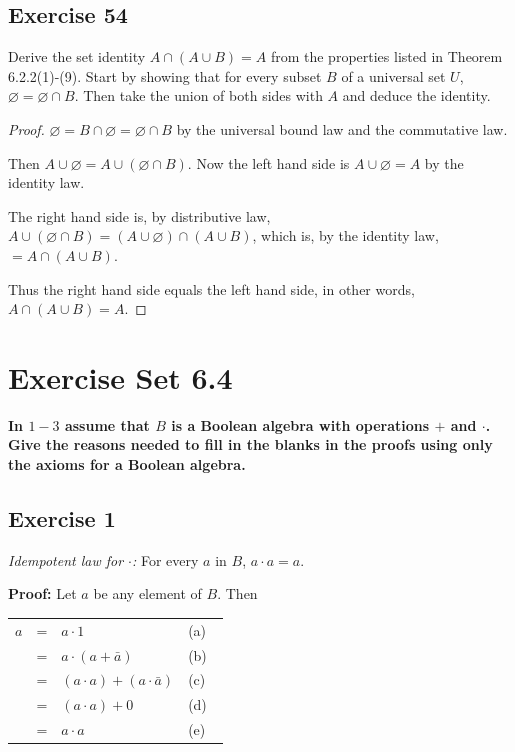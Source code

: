 \documentclass[14pt]{extarticle}
\newcommand{\es}{\varnothing}
\newcommand{\fbl}{\underline{\hspace{1cm}}\,\,}
\newcommand{\cy}{\color{cyan}}
\begin{document}
\subsection{Exercise 54}
Derive the set identity \(A \cap (A \cup B) = A\) from the properties listed in Theorem 6.2.2(1)-(9). Start by showing 
that for every subset $B$ of a universal set $U$, \(\es = \es \cap B\). Then take the union of both sides with $A$ 
and deduce the identity.

\begin{proof}
\(\es = B \cap \es = \es \cap B\) by the universal bound law and the commutative law.

Then \(A \cup \es = A \cup (\es \cap B)\). Now the left hand side is \(A \cup \es = A\) by the identity law.

The right hand side is, by distributive law, \(A \cup (\es \cap B) = (A \cup \es) \cap (A \cup B)\), which is, by the
identity law, \(= A \cap (A \cup B)\).

Thus the right hand side equals the left hand side, in other words, \(A \cap (A \cup B) = A\).
\end{proof}

\section{Exercise Set 6.4}

{\bf \cy In $1-3$ assume that $B$ is a Boolean algebra with operations $+$ and $\cdot$. Give the reasons needed to fill 
in the blanks in the proofs using only the axioms for a Boolean algebra.}

\subsection{Exercise 1}
{\it Idempotent law for $\cdot$:} For every $a$ in $B$, \(a \cdot a = a\).

{\bf Proof:} Let $a$ be any element of $B$. Then

\begin{center}
\begin{tabular}{rcll}
\(a\) & = & \(a \cdot 1\) & {\cy (a) \fbl} \\
\(\) & = & \(a \cdot (a + \bar{a})\) & {\cy (b) \fbl} \\
\(\) & = & \((a \cdot a) + (a \cdot \bar{a})\) & {\cy (c) \fbl} \\
\(\) & = & \((a \cdot a) + 0\) & {\cy (d) \fbl} \\
\(\) & = & \(a \cdot a\) & {\cy (e) \fbl}
\end{tabular}
\end{center}
\end{document}
